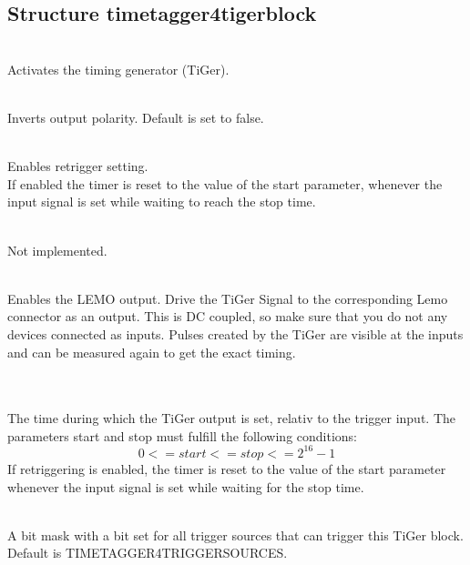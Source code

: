 			\subsection{Structure timetagger4\tu tiger\tu block\label{cp:tigerblock}}

			\\
			Activates the timing generator (TiGer).\par
	
			\\
			Inverts output polarity. Default is set to false.\par
	
			\\
			Enables retrigger setting.\\
			If enabled the timer is reset to the value of the \textsf{start} parameter, whenever the input signal is set while waiting to reach the \textsf{stop} time.\par
	
			\\
			Not implemented.
	
			\\
			Enables the LEMO output. Drive the TiGer Signal to the corresponding Lemo connector as an output. 
			This is DC coupled, so make sure that you do not any devices connected as inputs.
			Pulses created by the TiGer are visible at the \deviceName inputs and can be measured again to get the exact timing.  
	
			\\
			\\
			The time during which the TiGer output is set, relativ to the trigger input. The parameters \textsf{start} and \textsf{stop} must fulfill the following conditions:
			\[ 0 <= start <= stop <= 2^{16}-1 \]
			If retriggering is enabled, the timer is reset to the value of the start parameter whenever the input signal is set while waiting for the stop time. \par
			
	
			\\
			A bit mask with a bit set for all trigger sources that can trigger this TiGer block. 
			Default is \textsf{TIMETAGGER4\tu TRIGGER\tu SOURCE\tu S}.\par
	
